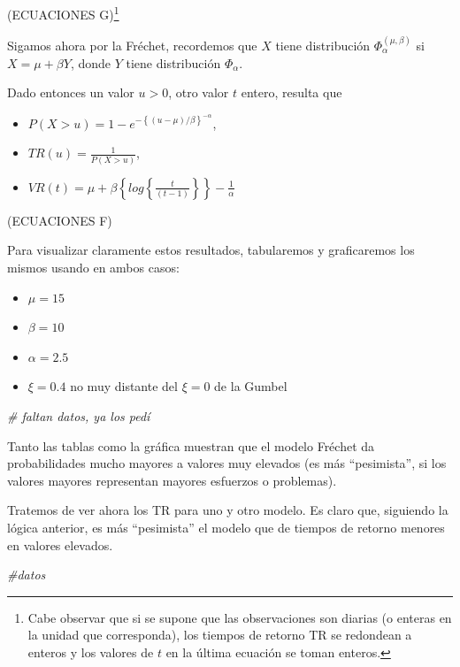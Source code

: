\documentclass[
]{book}
\newenvironment{Shaded}{\begin{snugshade}}{\end{snugshade}}
\newcommand{\CommentTok}[1]{\textcolor[rgb]{0.56,0.35,0.01}{\textit{#1}}}
\theoremstyle{definition}
\theoremstyle{definition}
\theoremstyle{definition}
\theoremstyle{definition}
\theoremstyle{remark}
\begin{document}
(ECUACIONES G)\footnote{Cabe observar que si se supone que las observaciones son diarias (o enteras en la unidad que corresponda), los tiempos de retorno TR se redondean a enteros y los valores de $t$ en la última ecuación se toman enteros.}

Sigamos ahora por la Fréchet, recordemos que \(X\) tiene distribución \(\Phi_{\alpha}^{( \mu,\beta)}\) si \(X= \mu+\beta Y\), donde \(Y\) tiene distribución \(\Phi_{\alpha}\).

Dado entonces un valor \(u>0\), otro valor \(t\) entero, resulta que

\begin{itemize}
\item $P(X>u)=1-e^{ -\left \{( u- \mu)/\beta\right \}^{-\alpha}}$,
\item $TR(u)=\frac{1}{P(X>u)}$,
\item $VR(t)= \mu+ \beta\left \{log\left \{ \frac{t}{(t-1)}\right \}\right \}-\frac{1}{\alpha}$
\end{itemize}

(ECUACIONES F)

Para visualizar claramente estos resultados, tabularemos
y graficaremos los mismos usando en ambos casos:

\begin{itemize}
\item $\mu=15$
\item $\beta=10$
\item $\alpha=2.5$
\item $\xi=0.4$ no muy distante del $\xi=0$ de la Gumbel
\end{itemize}

\begin{Shaded}
\begin{Highlighting}[]
\CommentTok{\# faltan datos, ya los pedí}
\end{Highlighting}
\end{Shaded}

Tanto las tablas como la gráfica muestran que el modelo Fréchet da probabilidades mucho mayores a valores muy elevados (es más ``pesimista'', si los valores mayores representan mayores esfuerzos o problemas).

Tratemos de ver ahora los TR para uno y otro modelo. Es claro que, siguiendo la lógica anterior, es más ``pesimista'' el modelo que de tiempos de retorno menores en valores elevados.

\begin{Shaded}
\begin{Highlighting}[]
\CommentTok{\#datos}
\end{Highlighting}
\end{Shaded}
\end{document}
